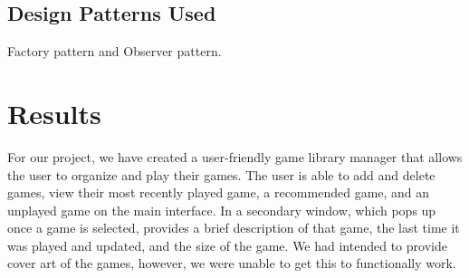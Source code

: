 \documentclass[10pt,conference,onecolumn,compsoc]{IEEEtran}
\begin{document}
\subsection{Design Patterns Used}
Factory pattern and Observer pattern.
%
%
\section{Results}
For our project, we have created a user-friendly game library manager that allows the user to organize and play their games. The user is able to add and delete games, view their most recently played game, a recommended game, and an unplayed game on the main interface. In a secondary window, which pops up once a game is selected, provides a brief description of that game, the last time it was played and updated, and the size of the game. We had intended to provide cover art of the games, however, we were unable to get this to functionally work.
%
\end{document}
